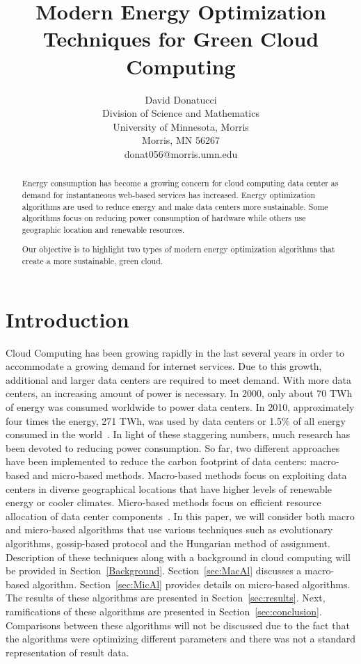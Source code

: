 \documentclass{sig-alternate}
\title{Modern Energy Optimization Techniques for Green Cloud Computing}
\author{
\alignauthor
 		David Donatucci\\
        Division of Science and Mathematics\\
        University of Minnesota, Morris\\
        Morris, MN 56267\\
        donat056@morris.umn.edu\\
}
\date{}
\begin{document}
\pagestyle{plain}

\maketitle

\begin{abstract}

Energy consumption has become a growing concern for cloud computing data center as demand for instantaneous web-based services has increased. Energy optimization algorithms are used to reduce energy and make data centers more sustainable. Some algorithms focus on reducing power consumption of hardware while others use geographic location and renewable resources. 

Our objective is to highlight two types of modern energy optimization algorithms that create a more sustainable, green cloud. 

\end{abstract}


\section{Introduction} \label{sec:intro}

Cloud Computing has been growing rapidly in the last several years in order to accommodate a growing demand for internet services. Due to this growth, additional and larger data centers are required to meet demand. With more data centers, an increasing amount of power is necessary. In 2000, only about 70 TWh of energy was consumed worldwide to power data centers. In 2010, approximately four times the energy, 271 TWh, was used by data centers or 1.5\% of all energy consumed in the world~\cite{Yanggratoke}. In light of these staggering numbers, much research has been devoted to reducing power consumption. So far, two different approaches have been implemented to reduce the carbon footprint of data centers: macro-based and micro-based methods. Macro-based methods focus on exploiting data centers in diverse geographical locations that have higher levels of renewable energy or cooler climates. Micro-based methods focus on efficient resource allocation of data center components~\cite{Hassan}. In this paper, we will consider both macro and micro-based algorithms that use various techniques such as evolutionary algorithms, gossip-based protocol and the Hungarian method of assignment. Description of these techniques along with a background in cloud computing will be provided in Section~\ref{Background}. Section~\ref{sec:MacAl} discusses a macro-based algorithm. Section~\ref{sec:MicAl} provides details on micro-based algorithms. The results of these algorithms are presented in Section~\ref{sec:results}. Next, ramifications of these algorithms are presented in Section~\ref{sec:conclusion}. Comparisons between these algorithms will not be discussed due to the fact that the algorithms were optimizing different parameters and there was not a standard representation of result data.
\end{document}
